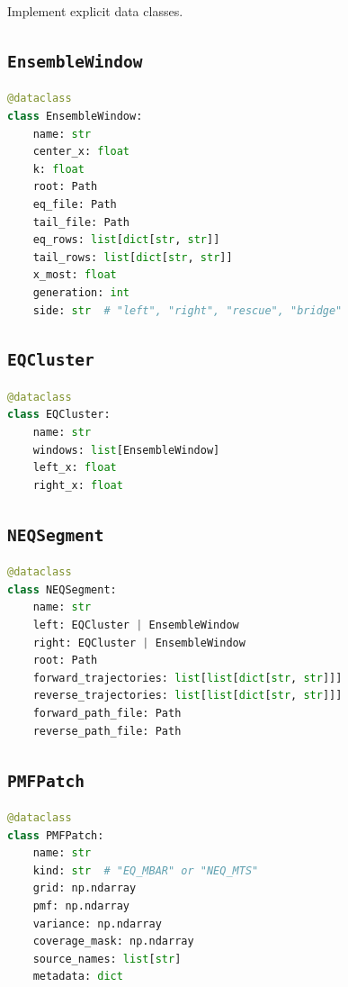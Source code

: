 \documentclass[
  10.5pt,
]{article}
\begin{document}
Implement explicit data classes.

\subsection{\texorpdfstring{\texttt{EnsembleWindow}}{EnsembleWindow}}\label{ensemblewindow}

\begin{lstlisting}[language=Python]
@dataclass
class EnsembleWindow:
    name: str
    center_x: float
    k: float
    root: Path
    eq_file: Path
    tail_file: Path
    eq_rows: list[dict[str, str]]
    tail_rows: list[dict[str, str]]
    x_most: float
    generation: int
    side: str  # "left", "right", "rescue", "bridge"
\end{lstlisting}

\subsection{\texorpdfstring{\texttt{EQCluster}}{EQCluster}}\label{eqcluster}

\begin{lstlisting}[language=Python]
@dataclass
class EQCluster:
    name: str
    windows: list[EnsembleWindow]
    left_x: float
    right_x: float
\end{lstlisting}

\subsection{\texorpdfstring{\texttt{NEQSegment}}{NEQSegment}}\label{neqsegment}

\begin{lstlisting}[language=Python]
@dataclass
class NEQSegment:
    name: str
    left: EQCluster | EnsembleWindow
    right: EQCluster | EnsembleWindow
    root: Path
    forward_trajectories: list[list[dict[str, str]]]
    reverse_trajectories: list[list[dict[str, str]]]
    forward_path_file: Path
    reverse_path_file: Path
\end{lstlisting}

\subsection{\texorpdfstring{\texttt{PMFPatch}}{PMFPatch}}\label{pmfpatch}

\begin{lstlisting}[language=Python]
@dataclass
class PMFPatch:
    name: str
    kind: str  # "EQ_MBAR" or "NEQ_MTS"
    grid: np.ndarray
    pmf: np.ndarray
    variance: np.ndarray
    coverage_mask: np.ndarray
    source_names: list[str]
    metadata: dict
\end{lstlisting}
\end{document}
